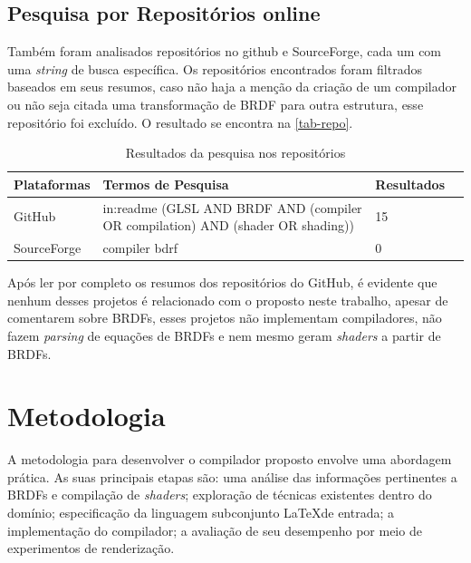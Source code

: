 \documentclass[english, 
               brazil, 
               bsc] %
               {dcomp-abntex2}
\begin{document}
\section{Pesquisa por Repositórios online}
Também foram analisados repositórios no github e SourceForge, cada um com uma \textit{string} de busca específica. Os repositórios encontrados foram filtrados baseados em seus resumos, caso não haja a menção da criação de um compilador ou não seja citada uma transformação de BRDF para outra estrutura, esse repositório foi excluído. O resultado se encontra na \autoref{tab-repo}.






\begin{table}[H]
\ABNTEXfontereduzida
\caption[bases]{Resultados da pesquisa nos repositórios}
\label{tab-repo}
\begin{tabular}{p{2.6cm}|p{6.0cm}|p{2.25cm}|p{3.40cm}}
   \textbf{Plataformas} & \textbf{Termos de Pesquisa}  & \textbf{Resultados}\\
   \hline
   GitHub
   &
   in:readme (GLSL AND BRDF AND  (compiler OR compilation) AND (shader OR shading))
   & 15
   \\ \hline
   SourceForge
   &
   compiler bdrf
   & 0
\end{tabular}
\end{table}




Após ler por completo os resumos dos repositórios do GitHub, é evidente que nenhum desses projetos é relacionado com o proposto neste trabalho, apesar de comentarem sobre BRDFs, esses projetos não implementam compiladores, não fazem \textit{parsing} de equações de BRDFs e nem mesmo geram \textit{shaders} a partir de BRDFs.


\chapter{Metodologia} \label{metodologia}


A metodologia para desenvolver o compilador proposto envolve uma abordagem prática. As suas principais etapas são: uma análise das informações pertinentes a BRDFs e compilação de \textit{shaders}; exploração de técnicas existentes dentro do domínio; especificação da linguagem subconjunto \LaTeX de entrada;  a implementação do compilador; a avaliação de seu desempenho por meio de experimentos de renderização.
\end{document}
